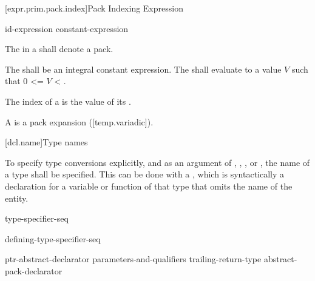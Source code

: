 \documentclass{wg21}
\begin{document}
\begin{addedblock}

[expr.prim.pack.index]{Pack Indexing Expression}

\begin{bnf}
    \br
    id-expression  \terminal{[} constant-expression \terminal{]}  \br
\end{bnf}

The  in a  shall denote a pack.

The  shall be an integral constant expression.
The  shall evaluate to a value $V$ such that 0 <= $V$ < .

The index of a  is the value of its .

A  is a pack expansion ([temp.variadic]).


\end{addedblock}

[dcl.name]{Type names}

\pnum
{}%
To specify type conversions explicitly,
%
and as an argument of
,
,
,
or
,
the name of a type shall be specified.
This can be done with a
,
which is syntactically a declaration for a variable or function
of that type that omits the name of the entity.

\begin{bnf}
    \br
    type-specifier-seq 
\end{bnf}

\begin{bnf}
    \br
    defining-type-specifier-seq 
\end{bnf}

\begin{bnf}
    \br
    ptr-abstract-declarator\br
     parameters-and-qualifiers trailing-return-type\br
    abstract-pack-declarator
\end{bnf}
\end{document}
